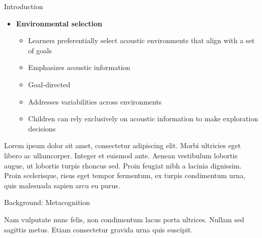 \documentclass[final]{beamer}
\newlength{\colwidth}
\begin{document}
\begin{frame}[t]
\begin{columns}[t]
\begin{column}{\colwidth}
\begin{block}{Introduction}
\begin{itemize}
\begin{itemize}
\begin{itemize}
              \item Learners interact with individual stimuli within their environment (Settles, 2009)
              \item Accurate stimuli labeling is a primary goal
            \end{itemize}
          \item Ecological active learning:
            \begin{itemize} 
              \item Children learn by tracking environmental features and adapt their exploration strategies accordingly (Ruggeri, 2022)
              \item Exploratory strategies for learning are context-dependent 
              \item Exploit statistical regularities in the environment to reduce demands on cognition
            \end{itemize}
        \end{itemize}
      \item \textbf{Environmental selection}
        \begin{itemize}
          \item Learners preferentially select acoustic environments that align with a set of goals
          \item Emphasizes acoustic information
          \item Goal-directed
          \item Addresses variabilities across environments
          \item Children can rely exclusively on acoustic information to make exploration decisions
        \end{itemize}
    \end{itemize}       

    Lorem ipsum dolor sit amet, consectetur adipiscing elit. Morbi ultricies
    eget libero ac ullamcorper. Integer et euismod ante. Aenean vestibulum
    lobortis augue, ut lobortis turpis rhoncus sed. Proin feugiat nibh a
    lacinia dignissim. Proin scelerisque, risus eget tempor fermentum, ex
    turpis condimentum urna, quis malesuada sapien arcu eu purus.

  \end{block}

  \begin{block}{Background: Metacognition}

    Nam vulputate nunc felis, non condimentum lacus porta ultrices. Nullam sed
    sagittis metus. Etiam consectetur gravida urna quis suscipit.


\end{block}
\end{column}
\end{columns}
\end{frame}
\end{document}
